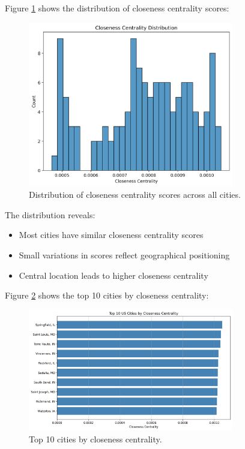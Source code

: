 Figure \ref{fig:closeness_dist} shows the distribution of closeness centrality scores:

\begin{figure}[H]
    \centering
    \includegraphics[width=0.8\textwidth]{figures/closeness_distribution.png}
    \caption{Distribution of closeness centrality scores across all cities.}
    \label{fig:closeness_dist}
\end{figure}

The distribution reveals:
\begin{itemize}
    \item Most cities have similar closeness centrality scores
    \item Small variations in scores reflect geographical positioning
    \item Central location leads to higher closeness centrality
\end{itemize}

Figure \ref{fig:top_closeness} shows the top 10 cities by closeness centrality:

\begin{figure}[H]
    \centering
    \includegraphics[width=0.8\textwidth]{figures/top_closeness.png}
    \caption{Top 10 cities by closeness centrality.}
    \label{fig:top_closeness}
\end{figure}

